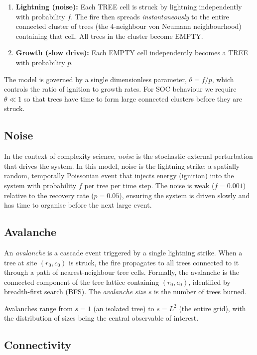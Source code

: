 \documentclass[12pt,a4paper]{article}
\begin{document}
\begin{enumerate}
  \item \textbf{Lightning (noise):} Each TREE cell is struck by lightning
        independently with probability $f$. The fire then spreads
        \emph{instantaneously} to the entire connected cluster of trees
        (the 4-neighbour von Neumann neighbourhood) containing that cell.
        All trees in the cluster become EMPTY.
  \item \textbf{Growth (slow drive):} Each EMPTY cell independently becomes
        a TREE with probability $p$.
\end{enumerate}

The model is governed by a single dimensionless parameter,
$\theta = f/p$, which controls the ratio of ignition to growth rates.
For SOC behaviour we require $\theta \ll 1$ so that trees have time to form
large connected clusters before they are struck.

\subsection{Noise}

In the context of complexity science, \emph{noise} is the stochastic external
perturbation that drives the system.
In this model, noise is the lightning strike: a spatially random, temporally
Poissonian event that injects energy (ignition) into the system with
probability $f$ per tree per time step.
The noise is weak ($f=0.001$) relative to the recovery rate ($p=0.05$),
ensuring the system is driven slowly and has time to organise before the next
large event.

\subsection{Avalanche}

An \emph{avalanche} is a cascade event triggered by a single lightning strike.
When a tree at site $(r_0, c_0)$ is struck, the fire propagates to all
trees connected to it through a path of nearest-neighbour tree cells.
Formally, the avalanche is the connected component of the tree lattice
containing $(r_0, c_0)$, identified by breadth-first search (BFS).
The \emph{avalanche size} $s$ is the number of trees burned.

Avalanches range from $s=1$ (an isolated tree) to $s=L^2$ (the entire grid),
with the distribution of sizes being the central observable of interest.

\subsection{Connectivity}
\end{document}
